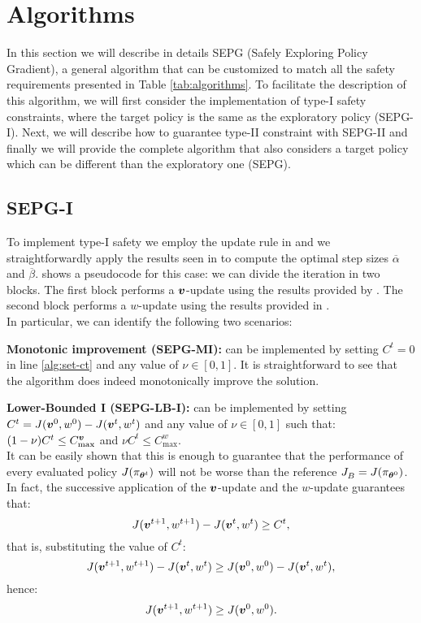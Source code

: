 \section{Algorithms}\label{sec:algos}

In this section we will describe in details SEPG (Safely Exploring Policy Gradient), a general algorithm that can be customized to match all the safety requirements presented in Table \ref{tab:algorithms}. To facilitate the description of this algorithm, we will first consider the implementation of type-I safety constraints, where the target policy is the same as the exploratory policy (SEPG-I). Next, we will describe how to guarantee type-II constraint with SEPG-II and finally we will provide the complete algorithm that also considers a target policy which can be different than the exploratory one (SEPG).

\subsection{SEPG-I}

To implement type-I safety we employ the update rule in  and we straightforwardly apply the results seen in  to compute the optimal step sizes $\overline{\alpha}$ and $\overline{\beta}$.  shows a pseudocode for this case: we can divide the iteration in two blocks. The first block performs a $\vv$-update using the results provided by . The second block performs a $w$-update using the results provided in . \\
In particular, we can identify the following two scenarios:

\textbf{Monotonic improvement (SEPG-MI):} can be implemented by setting $C^t=0$ in line \ref{alg:set-ct} and any value of $\nu\in[0,1]$. It is straightforward to see that the algorithm does indeed monotonically improve the solution.

\textbf{Lower-Bounded I (SEPG-LB-I):} can be implemented by setting $C^t = J(\vv^0, w^0) - J(\vv^t, w^t)$ and any value of $\nu\in[0,1]$ such that: $(1-\nu)C^t \leq C_{\text{max}}^{\vv}$ and $\nu C^t \leq C_{\text{max}}^w$. \\
It can be easily shown that this is enough to guarantee that the performance of every evaluated policy $J(\pi_{\vtheta^t})$ will not be worse than the reference $\jbase[] = J(\pi_{\vtheta^0})$.  In fact, the successive application of the $\vv$-update and the $w$-update guarantees that:
\[
J(\vv^{t+1}, w^{t+1}) - J(\vv^t, w^t) \geq C^t,
\]
that is, substituting the value of $C^t$:
\[
J(\vv^{t+1}, w^{t+1}) - J(\vv^t, w^t) \geq J(\vv^0, w^0) - J(\vv^t, w^t),
\]
hence:
\[
J(\vv^{t+1}, w^{t+1})  \geq J(\vv^0, w^0).
\]

